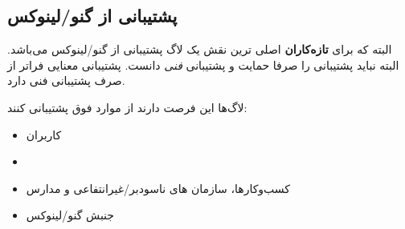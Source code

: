 
\subsection{پشتیبانی از گنو/لینوکس }

البته که برای
{\bfseries تازه‌کاران}
اصلی ترین نقش یک لاگ پشتیبانی از گنو/لینوکس می‌باشد.
البته نباید پشتیبانی را صرفا حمایت و پشتیبانی
{\itshape فنی}
دانست. پشتیبانی معنایی فراتر از صرف پشتیبانی فنی دارد.

لاگ‌ها این فرصت دارند از موارد فوق پشتیبانی کنند:

\begin{itemize}
\item
کاربران
\item {}
\item
کسب‌وکارها، سازمان های ناسودبر/غیرانتفاعی و مدارس
\item
جنبش گنو/لینوکس
\end{itemize}

